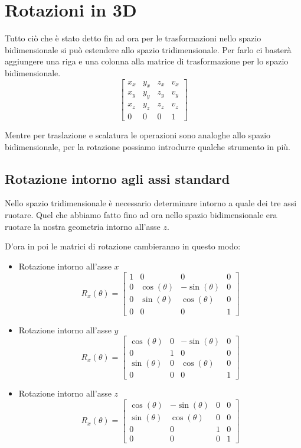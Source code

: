 \chapter{Rotazioni in 3D}\label{3D}
Tutto ci\`o che \`e stato detto fin ad ora per le trasformazioni nello spazio bidimensionale si pu\`o estendere allo
spazio tridimensionale. Per farlo ci baster\`a aggiungere una riga e una colonna alla matrice di trasformazione per lo
spazio bidimensionale.
\[
	\begin{bmatrix}
		x_x & y_x & z_x & v_x \\
		x_y & y_y & z_y & v_y \\
		x_z & y_z & z_z & v_z \\
		0   & 0   & 0   & 1
	\end{bmatrix}
\]

Mentre per traslazione e scalatura le operazioni sono analoghe allo spazio bidimensionale, per la rotazione possiamo
introdurre qualche strumento in pi\`u.

\section{Rotazione intorno agli assi standard}
Nello spazio tridimensionale \`e necessario determinare intorno a quale dei tre assi ruotare. Quel che abbiamo fatto
fino ad ora nello spazio bidimensionale era ruotare la nostra geometria intorno all'asse $z$.

D'ora in poi le matrici di rotazione cambieranno in questo modo:
\begin{itemize}
	\item Rotazione intorno all'asse $x$
	      \[
		      R_x(\theta) = \begin{bmatrix}
			      1 & 0            & 0             & 0 \\
			      0 & \cos(\theta) & -\sin(\theta) & 0 \\
			      0 & \sin(\theta) & \cos(\theta)  & 0 \\
			      0 & 0            & 0             & 1
		      \end{bmatrix}
	      \]
	\item Rotazione intorno all'asse $y$
	      \[
		      R_x(\theta) = \begin{bmatrix}
			      \cos(\theta) & 0 & -\sin(\theta) & 0 \\
			      0            & 1 & 0             & 0 \\
			      \sin(\theta) & 0 & \cos(\theta)  & 0 \\
			      0            & 0 & 0             & 1
		      \end{bmatrix}
	      \]
	\item Rotazione intorno all'asse $z$
	      \[
		      R_x(\theta) = \begin{bmatrix}
			      \cos(\theta) & -\sin(\theta) & 0 & 0 \\
			      \sin(\theta) & \cos(\theta)  & 0 & 0 \\
			      0            & 0             & 1 & 0 \\
			      0            & 0             & 0 & 1
		      \end{bmatrix}
	      \]
\end{itemize}

